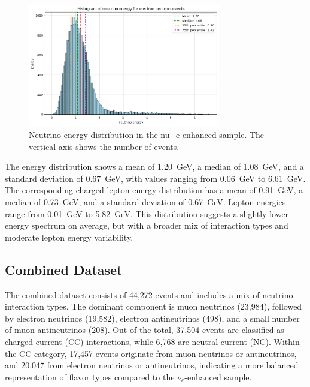 \documentclass{pracalicmgr}
\begin{document}
\begin{figure}[H]
    \centering
    \includegraphics[width=0.75\textwidth]{src/neutrinoElectron.png}
    \caption{Neutrino energy distribution in the nu\_e-enhanced sample. The vertical axis shows the number of events.}
    \label{fig:neutrino-nue}
\end{figure}


The energy distribution shows a mean of 1.20~GeV, a median of 1.08~GeV, and a standard deviation of 0.67~GeV, with values ranging from 0.06~GeV to 6.61~GeV. The corresponding charged lepton energy distribution has a mean of 0.91~GeV, a median of 0.73~GeV, and a standard deviation of 0.67~GeV. Lepton energies range from 0.01~GeV to 5.82~GeV. This distribution suggests a slightly lower-energy spectrum on average, but with a broader mix of interaction types and moderate lepton energy variability.

\subsection{Combined Dataset}

The combined dataset consists of 44,272 events and includes a mix of neutrino interaction types. The dominant component is muon neutrinos (23,984), followed by electron neutrinos (19,582), electron antineutrinos (498), and a small number of muon antineutrinos (208). Out of the total, 37,504 events are classified as charged-current (CC) interactions, while 6,768 are neutral-current (NC). Within the CC category, 17,457 events originate from muon neutrinos or antineutrinos, and 20,047 from electron neutrinos or antineutrinos, indicating a more balanced representation of flavor types compared to the $\nu_e$-enhanced sample. 
\end{document}

